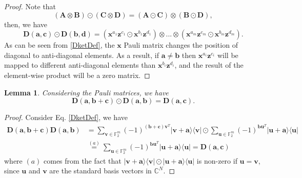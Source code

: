 \documentclass[lettersize,journal,onecolumn]{IEEEtran}
\newtheorem{lemma}{Lemma}
\begin{document}
 \begin{proof}
 	Note that 
 	\begin{equation}\label{KronDotFeature}
 		\left(\mathbf{A} \otimes \mathbf{B} \right) \odot \left(\mathbf{C} \otimes  \mathbf{D} \right) = \left(\mathbf{A} \odot \mathbf{C} \right) \otimes \left(\mathbf{B} \odot \mathbf{D}\right),
 	\end{equation}
 	then, we have
 	\begin{equation}
 		\mathbf{D}(\mathbf{a}, \mathbf{c}) \odot \mathbf{D}(\mathbf{b}, \mathbf{d}) = \left(\mathbf{x}^{a_1} \mathbf{z}^{c_1}   \odot \mathbf{x}^{b_1} \mathbf{z}^{d_1}  \right) \otimes ...\otimes \left(\mathbf{x}^{a_m} \mathbf{z}^{c_m}  \odot \mathbf{x}^{b_m} \mathbf{z}^{d_m}  \right).
 	\end{equation}
 As can be seen from \eqref{DketDef}, the $\mathbf{x}$ Pauli matrix changes the position of diagonal to anti-diagonal elements. As a result, if $\mathbf{a}\neq \mathbf{b}$ then $\mathbf{x}^{a_i} \mathbf{z}^{c_i}$ will be mapped to different anti-diagonal elements than $\mathbf{x}^{b_i} \mathbf{z}^{d_i}$, and  the result of the element-wise product will be a zero matrix.
 \end{proof}
\begin{lemma}\label{LemaDabcDac}
	Considering the Pauli matrices, we have
	\begin{equation}
		\mathbf{D}\left(\mathbf{a,b+c}\right) \odot \mathbf{D}\left(\mathbf{a,b}\right) = \mathbf{D}\left(\mathbf{a,c}\right).
	\end{equation}
\end{lemma}
\begin{proof}
Consider Eq. \eqref{DketDef}, we have
\begin{align}
	\mathbf{D}\left(\mathbf{a,b+c}\right) \mathbf{D}\left(\mathbf{a,b}\right)& = \sum_{\mathbf{v} \in \mathbb{F}_2^m}{\left(-1\right)^{\left(\mathbf{b+c}\right)\mathbf{v}^T} |\mathbf{v+a}\rangle \langle\mathbf{v}|}\odot \sum_{\mathbf{u} \in \mathbb{F}_2^m}{\left(-1\right)^{\mathbf{b}\mathbf{u}^T} |\mathbf{u+a}\rangle \langle\mathbf{u}|} \nonumber \\
	& \stackrel{(a)}{=}\sum_{\mathbf{u} \in \mathbb{F}_2^m}{\left(-1\right)^{\mathbf{b}\mathbf{u}^T} |\mathbf{u+a}\rangle \langle\mathbf{u}|} = \mathbf{D}\left(\mathbf{a,c}\right)  
\end{align}
where $(a)$ comes from the fact that $|\mathbf{v+a}\rangle \langle\mathbf{v}| \odot |\mathbf{u+a}\rangle \langle\mathbf{u}|$ is non-zero if $\mathbf{u=v}$, since $\mathbf{u}$ and $\mathbf{v}$ are the standard basis vectors in $\mathbb{C}^N$.
\end{proof}
\end{document}
